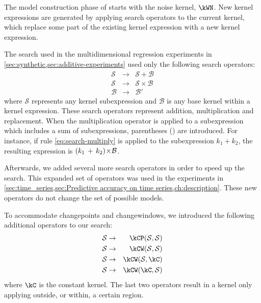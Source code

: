 The model construction phase of \procedurename{} starts with the noise kernel, $\kWN$.
New kernel expressions are generated by applying search operators to the current kernel, which replace some part of the existing kernel expression with a new kernel expression.



The search used in the multidimensional regression experiments in \cref{sec:synthetic,sec:additive-experiments} used only the following search operators:
%
\begin{eqnarray}
\mathcal{S} &\to& \mathcal{S} + \mathcal{B} \\
\mathcal{S} &\to& \mathcal{S} \times \mathcal{B} \label{eq:search-multiply}\\
\mathcal{B} &\to& \mathcal{B'}
\end{eqnarray}
%
where $\mathcal{S}$ represents any kernel subexpression and $\mathcal{B}$ is any base kernel within a kernel expression.
These search operators represent addition, multiplication and replacement.
When the multiplication operator is applied to a subexpression which includes a sum of subexpressions, parentheses () are introduced.
For instance, if rule \eqref{eq:search-multiply} is applied to the subexpression $k_1 + k_2$, the resulting expression is $(k_1 \, + \, k_2) \! \times \! \mathcal{B}$.

Afterwards, we added several more search operators in order to speed up the search.
This expanded set of operators was used in the experiments in \cref{sec:time_series,sec:Predictive accuracy on time series,ch:description}.
These new operators do not change the set of possible models.

To accommodate changepoints and changewindows, we introduced the following additional operators to our search:
%
\begin{eqnarray}
\mathcal{S} &\to& \kCP(\mathcal{S},\mathcal{S}) \\
\mathcal{S} &\to& \kCW(\mathcal{S},\mathcal{S}) \\
\mathcal{S} &\to& \kCW(\mathcal{S},\kC) \\
\mathcal{S} &\to& \kCW(\kC,\mathcal{S})
\end{eqnarray}
%
where $\kC$ is the constant kernel.
The last two operators result in a kernel only applying outside, or within, a certain region.

